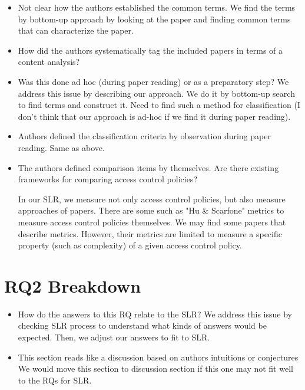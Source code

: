 \begin{itemize}

\item Not clear how the authors established the common terms.
We find the terms by bottom-up approach by looking at the paper and finding common terms that can characterize the paper. 

\item How did the authors systematically tag the included papers in terms of a content analysis?

\item Was this done ad hoc (during paper reading) or as a preparatory step?
We address this issue by describing our approach. We do it by bottom-up search to find terms and construct it. Need to find such a method for classification (I don't think that our approach is ad-hoc if we find it during paper reading).

\item Authors defined the classification criteria by observation during paper reading.
Same as above.

\item The authors defined comparison items by themselves. Are there existing frameworks for comparing access control policies?

In our SLR, we measure not only access control policies, but also measure approaches of papers.
There are some such as "Hu \& Scarfone" metrics to measure access control policies themselves. We may find some papers that describe metrics. However, their metrics are limited to measure a specific property (such as complexity) of a given access control policy. 


\end{itemize}


\section{RQ2 Breakdown}

\begin{itemize}

\item How do the answers to this RQ relate to the SLR?
We address this issue by checking SLR process to understand what kinds of answers would be expected. Then, we adjust our answers to fit to SLR.

\item This section reads like a discussion based on authors intuitions or conjectures
We would move this section to discussion section if this one may not fit well to the RQs for SLR.

\end{itemize}


